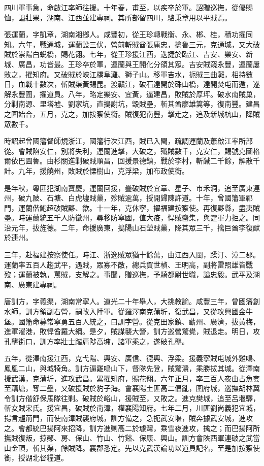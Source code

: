 \begin{pinyinscope}
四川軍事急，命啟江率師往援。十年春，甫至，以疾卒於軍。詔贈巡撫，從優賜恤，謚壯果，湖南、江西並建專祠。其所部留四川，駱秉章用以平賊焉。

張運蘭，字凱章，湖南湘鄉人。咸豐初，從王珍轉戰衡、永、郴、桂，積功擢同知。六年，戰通城，運蘭設三伏，營前斬賊酋張庸忠，擒魯三元，克通城，又大破賊於崇陽白蜺橋，賜花翎。七年，從王珍援江西，迭捷於臨江、吉安、樂安、新城、廣昌，功皆最。王珍卒於軍，運蘭與王開化分領其眾。吉安賊窺永豐，運蘭屢敗之，擢知府。又破賊於峽江橋阜灘、獅子山。移軍吉水，扼賊三曲灘，相持數日，血戰十數次，斬賊渠黃錫昆。渡贛江，破石達開於硃山橋，達開焚屯而遁，遂解永豐圍，擢道員。八年，略定樂安、宜黃，逼建昌，敗賊於厚坪。破水南賊巢，分剿南源、里塔墟、劉家坑，直搗謝坑，毀賊壘，斬其酋廖雄篙等，復南豐。建昌之圍始合，五月，克之，加按察使銜。賊復犯南豐，擊走之，追及新城杭山，降賊眾數千。

時詔起曾國籓督師規浙江，國籓行次江西，賊已入閩，疏調運蘭及蕭啟江率所部從。會賊陷安仁，別將失利，運蘭進擊，大破之，殲賊數千，克安仁，賜號克圖格爾依巴圖魯。由杉關進剿破賊順昌，回援景德鎮，戰於李村，斬馘二千餘，解散千計。九年，援饒州，敗賊於慄樹山，克浮梁，加布政使銜。

是年秋，粵匪犯湖南寶慶，運蘭回援，疊破賊於宜章、星子、市禾洞，追至廣東連州，破九陂、石塘、白虎墟賊巢，殄賊逾萬，授開歸陳許道。十年，曾國籓軍祁門，運蘭偕鮑超破賊黟、歙。十一年，克休寧，擢福建按察使。再復黟縣，盡夷賊壘。時運蘭統五千人防徽州，尋移防寧國，值大疫，悍賊麕集，與霆軍力拒之。同治元年，拔旌德。二年，命援廣東，搗陽山石塋賊巢，降其眾三千，擒巨酋李復猷於連州。

三年，赴福建按察使任。時江、浙逸賊眾猶十餘萬，由江西入閩，蹂汀、漳二郡。運蘭率五百人趨武平，遇賊，眾寡不敵，總兵賀世楨、王明高，副將雷照雄皆戰歿；運蘭被執，罵賊，支解之。事聞，贈巡撫，予騎都尉世職，謚忠毅。武平及湖南、廣東建專祠。

唐訓方，字義渠，湖南常寧人。道光二十年舉人，大挑教諭。咸豐三年，曾國籓創水師，訓方領副右營，嗣改入陸軍。從羅澤南克蒲圻，復武昌，又從攻興國金牛堡。國籓命募常寧勇五百人統之，曰訓字營。從克田家鎮、蘄州、廣濟，拔黃梅，進軍濯港，敗悍酋羅大綱。是夕，賊謀襲大營，訓方巡營驚覺，賊退走。明日，攻孔壟街口，訓方率壯士踏肩陟高墉，諸軍乘之，遂破孔壟。

五年，從澤南援江西，克弋陽、興安、廣信、德興、浮梁。援義寧賊屯城外雞鳴、鳳凰二山，與城犄角。訓方逼雞鳴山下，督隊先登，賊驚潰，乘勝拔其城。從澤南援武漢，克蒲圻，進攻武昌。累擢知府，賜花翎。六年正月，率三百人夜由占魚套至藕塘，奪二壘，又破援賊於豹子海。會襄陽土匪高二倡亂，圍府城，巡撫胡林翼令訓方偕舒保馬隊往剿。破賊於峪山，援賊至，又敗之。進克樊城，追至呂堰驛，斬女賊宋氏。援宜昌，破賊於南漳，權襄陽知府。七年二月，川匪劉尚義犯宜城，揚言趨荊門，而使南漳賊襲府城，訓方備之，急扼武安堰，賊奔據武安城，進攻之。會都統巴揚阿來招降，訓方進剿高二於璩灣，乘雪夜進攻，擒之；而巴揚阿所撫賊復叛，掠鄖、房、保山、竹山、竹谿、保康、興山。訓方會陜西軍連破之武當山金頂，斬其渠，餘賊降。襄郡悉定。先以克武漢論功以道員記名，至是加按察使銜，授湖北督糧道。


\end{pinyinscope}
